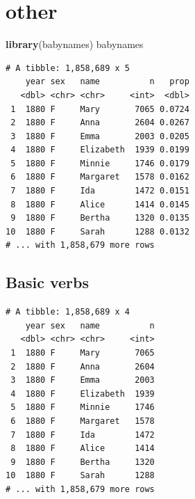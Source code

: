 \documentclass[]{book}
\newenvironment{Shaded}{\begin{snugshade}}{\end{snugshade}}
\newcommand{\KeywordTok}[1]{\textcolor[rgb]{0.13,0.29,0.53}{\textbf{#1}}}
\newcommand{\NormalTok}[1]{#1}
\newcommand{\OperatorTok}[1]{\textcolor[rgb]{0.81,0.36,0.00}{\textbf{#1}}}
\newcommand{\StringTok}[1]{\textcolor[rgb]{0.31,0.60,0.02}{#1}}
\theoremstyle{definition}
\theoremstyle{definition}
\theoremstyle{definition}
\theoremstyle{remark}
\begin{document}
\hypertarget{other}{%
\section{other}\label{other}}

\begin{Shaded}
\begin{Highlighting}[]
\KeywordTok{library}\NormalTok{(babynames)}
\NormalTok{babynames}
\end{Highlighting}
\end{Shaded}

\begin{verbatim}
# A tibble: 1,858,689 x 5
    year sex   name          n   prop
   <dbl> <chr> <chr>     <int>  <dbl>
 1  1880 F     Mary       7065 0.0724
 2  1880 F     Anna       2604 0.0267
 3  1880 F     Emma       2003 0.0205
 4  1880 F     Elizabeth  1939 0.0199
 5  1880 F     Minnie     1746 0.0179
 6  1880 F     Margaret   1578 0.0162
 7  1880 F     Ida        1472 0.0151
 8  1880 F     Alice      1414 0.0145
 9  1880 F     Bertha     1320 0.0135
10  1880 F     Sarah      1288 0.0132
# ... with 1,858,679 more rows
\end{verbatim}

\hypertarget{basic-verbs}{%
\subsection{Basic verbs}\label{basic-verbs}}

\begin{Shaded}
\end{Shaded}

\begin{verbatim}
# A tibble: 1,858,689 x 4
    year sex   name          n
   <dbl> <chr> <chr>     <int>
 1  1880 F     Mary       7065
 2  1880 F     Anna       2604
 3  1880 F     Emma       2003
 4  1880 F     Elizabeth  1939
 5  1880 F     Minnie     1746
 6  1880 F     Margaret   1578
 7  1880 F     Ida        1472
 8  1880 F     Alice      1414
 9  1880 F     Bertha     1320
10  1880 F     Sarah      1288
# ... with 1,858,679 more rows
\end{verbatim}

\begin{Shaded}
\end{Shaded}
\end{document}
